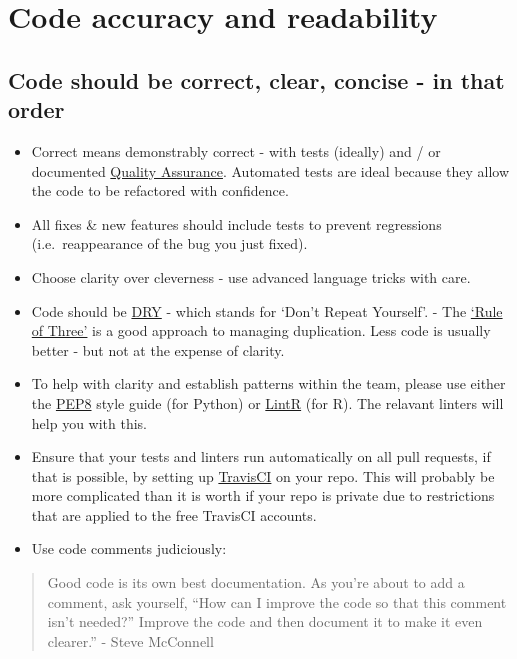 \documentclass[]{book}
\providecommand{\tightlist}{%
  \setlength{\itemsep}{0pt}\setlength{\parskip}{0pt}}
\begin{document}
\hypertarget{ccc}{%
\section{Code accuracy and readability}\label{ccc}}

\hypertarget{code-should-be-correct-clear-concise---in-that-order}{%
\subsection{Code should be correct, clear, concise - in that order}\label{code-should-be-correct-clear-concise---in-that-order}}

\begin{itemize}
\tightlist
\item
  Correct means demonstrably correct - with tests (ideally) and / or documented \href{quality_assurance.md}{Quality Assurance}. Automated tests are ideal because they allow the code to be refactored with confidence.
\item
  All fixes \& new features should include tests to prevent regressions (i.e.~reappearance of the bug you just fixed).
\item
  Choose clarity over cleverness - use advanced language tricks with care.
\item
  Code should be \href{https://en.wikipedia.org/wiki/Don\%27t_repeat_yourself}{DRY} - which stands for `Don't Repeat Yourself'. - The \href{https://en.wikipedia.org/wiki/Rule_of_three_(computer_programming)}{`Rule of Three'} is a good approach to managing duplication. Less code is usually better - but not at the expense of clarity.\\
\item
  To help with clarity and establish patterns within the team, please use either the \href{https://pypi.python.org/pypi/pep8}{PEP8} style guide (for Python) or \href{https://github.com/jimhester/lintr}{LintR} (for R). The relavant linters will help you with this.
\item
  Ensure that your tests and linters run automatically on all pull requests, if that is possible, by setting up \href{https://travis-ci.org/}{TravisCI} on your repo. This will probably be more complicated than it is worth if your repo is private due to restrictions that are applied to the free TravisCI accounts.
\item
  Use code comments judiciously:
\end{itemize}

\begin{quote}
Good code is its own best documentation. As you're about to add a comment, ask yourself, ``How can I improve the code so that this comment isn't needed?'' Improve the code and then document it to make it even clearer.'' - Steve McConnell
\end{quote}
\end{document}

